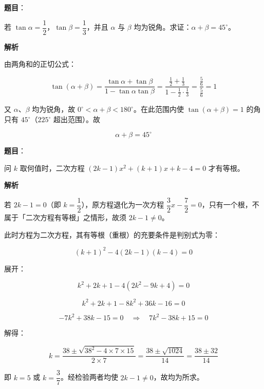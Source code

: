 \begin{answer}

\textbf{题目}：

若 $\tan\alpha=\dfrac12$，$\tan\beta=\dfrac13$，并且 $\alpha$ 与 $\beta$ 均为锐角。求证：$\alpha+\beta=45^\circ$。

\textbf{解析}

由两角和的正切公式：

\nopagebreak[4]
\[
\tan(\alpha+\beta)=\frac{\tan\alpha+\tan\beta}{1-\tan\alpha\tan\beta}=\frac{\frac12+\frac13}{1-\frac12\cdot\frac13}=\frac{\frac56}{\frac56}=1
\]

又 $\alpha$、$\beta$ 均为锐角，故 $0^\circ<\alpha+\beta<180^\circ$。在此范围内使 $\tan(\alpha+\beta)=1$ 的角只有 $45^\circ$（$225^\circ$ 超出范围）。故

\nopagebreak[4]
\[
\alpha+\beta=45^\circ
\]


\end{answer}
\begin{answer}

\textbf{题目}：

问 $k$ 取何值时，二次方程 $(2k-1)x^2+(k+1)x+k-4=0$ 才有等根。

\textbf{解析}

若 $2k-1=0$（即 $k=\dfrac12$），原方程退化为一次方程 $\dfrac32x-\dfrac72=0$，只有一个根，不属于「二次方程有等根」之情形，故须 $2k-1\ne0$。

此时方程为二次方程，其有等根（重根）的充要条件是判别式为零：

\nopagebreak[4]
\[
(k+1)^2-4(2k-1)(k-4)=0
\]

展开：

\nopagebreak[4]
\[
k^2+2k+1-4(2k^2-9k+4)=0
\]

\nopagebreak[4]
\[
k^2+2k+1-8k^2+36k-16=0
\]

\nopagebreak[4]
\[
-7k^2+38k-15=0\quad\Longrightarrow\quad 7k^2-38k+15=0
\]

解得：

\nopagebreak[4]
\[
k=\frac{38\pm\sqrt{38^2-4\times7\times15}}{2\times7}=\frac{38\pm\sqrt{1024}}{14}=\frac{38\pm32}{14}
\]

即 $k=5$ 或 $k=\dfrac{3}{7}$。经检验两者均使 $2k-1\ne0$，故均为所求。


\end{answer}
